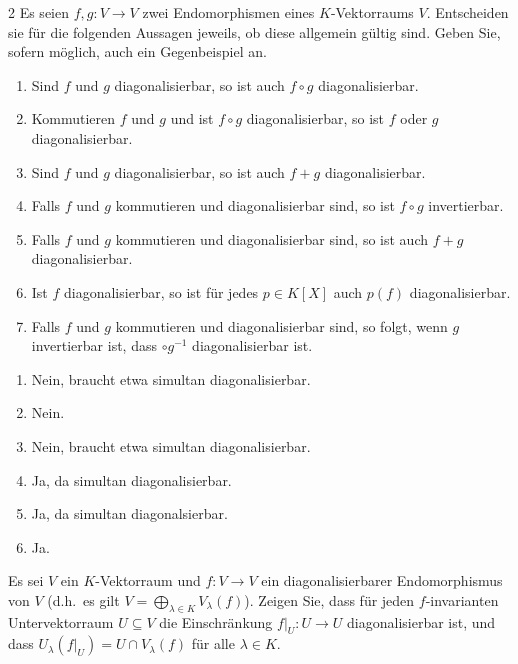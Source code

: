 \begin{question}[subtitle = Multiple Choice zur Kombination diagonalisierbarer Endomorphismen]{2}
  Es seien $f, g \colon V \to V$ zwei Endomorphismen eines $K$-Vektorraums $V$.
  Entscheiden sie für die folgenden Aussagen jeweils, ob diese allgemein gültig sind.
  Geben Sie, sofern möglich, auch ein Gegenbeispiel an.
  \begin{enumerate}[leftmargin=*]
    \item
      Sind $f$ und $g$ diagonalisierbar, so ist auch $f \circ g$ diagonalisierbar.
    \item
      Kommutieren $f$ und $g$ und ist $f \circ g$ diagonalisierbar, so ist $f$ oder $g$ diagonalisierbar.
    \item
      Sind $f$ und $g$ diagonalisierbar, so ist auch $f + g$ diagonalisierbar.
    \item
      Falls $f$ und $g$ kommutieren und diagonalisierbar sind, so ist $f \circ g$ invertierbar.
    \item
      Falls $f$ und $g$ kommutieren und diagonalisierbar sind, so ist auch $f + g$ diagonalisierbar.
    \item
      Ist $f$ diagonalisierbar, so ist für jedes $p \in K[X]$ auch $p(f)$ diagonalisierbar.
    \item
      Falls $f$ und $g$ kommutieren und diagonalisierbar sind, so folgt, wenn $g$ invertierbar ist, dass $ \circ g^{-1}$ diagonalisierbar ist.
  \end{enumerate}
\end{question}

\begin{solution}
  \begin{enumerate}
    \item
      Nein, braucht etwa simultan diagonalisierbar.
    \item
      Nein.
    \item
      Nein, braucht etwa simultan diagonalisierbar.
    \item
      Ja, da simultan diagonalisierbar.
    \item
      Ja, da simultan diagonalsierbar.
    \item
      Ja.
  \end{enumerate}
\end{solution}


\begin{question}[subtitle = Einschränkung diagonalisierbarer Endomorphismen]{2}
  Es sei $V$ ein $K$-Vektorraum und $f \colon V \to V$ ein diagonalisierbarer Endomorphismus von $V$ (d.h.\ es gilt \mbox{$V = \bigoplus_{\lambda \in K} V_\lambda(f)$}).
  Zeigen Sie, dass für jeden $f$-invarianten Untervektorraum $U \subseteq V$ die Einschränkung $f|_U \colon U \to U$ diagonalisierbar ist, und dass $U_\lambda(f|_U) = U \cap V_\lambda(f)$ für alle $\lambda \in K$.
\end{question}


